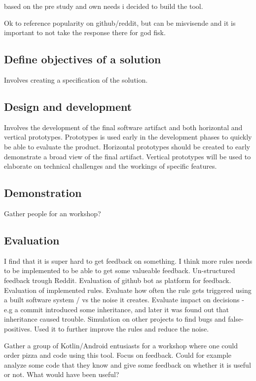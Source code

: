 \documentclass{article}
\begin{document}
based on the pre study and own needs i decided to build the tool.

Ok to reference popularity on github/reddit, but can be misvisende and it is important to not take the response there for god fisk.

\subsection{Define objectives of a solution}
Involves creating a specification of the solution.

\subsection{Design and development}
Involves the development of the final software artifact and both horizontal and vertical prototypes. Prototypes is used early in the development phases to quickly be able to evaluate the product. Horizontal prototypes should be created to early demonstrate a broad view of the final artifact. Vertical prototypes will be used to elaborate on technical challenges and the workings of specific features. 
 
\subsection{Demonstration}
Gather people for an workshop? 
 
\subsection{Evaluation}
I find that it is super hard to get feedback on something. I think more rules needs to be implemented to be able to get some valueable feedback. Un-structured feedback trough Reddit. Evaluation of github bot as platform for feedback. Evaluation of implemented rules. Evaluate how often the rule gets triggered using a built software system / vs the noise it creates. Evaluate impact on decisions - e.g a commit introduced some inheritance, and later it was found out that inheritance caused trouble. Simulation on other projects to find bugs and false-positives. Used it to further improve the rules and reduce the noise.

Gather a group of Kotlin/Android entusiasts for a workshop where one could order pizza and code using this tool. Focus on feedback. Could for example analyze some code that they know and give some feedback on whether it is useful or not. What would have been useful?
\end{document}
